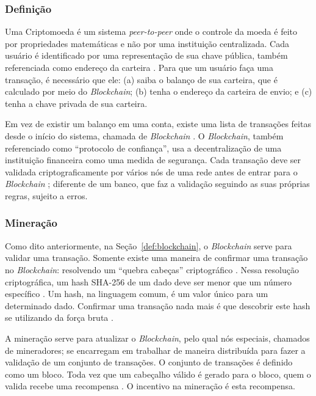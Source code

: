 \documentclass[
article,			%
12pt,				%
openright,			%
oneside,			%
a4paper,			%
chapter=TITLE,		%
section=TITLE,		%
subsection=TITLE,	%
subsubsection=TITLE,%
subsubsubsection=TITLE, %
english,			%
brazil,				%
]{abntex2}
\begin{document}
\subsubsection{Definição}

Uma Criptomoeda é um sistema \emph{peer-to-peer} onde o controle da
moeda é feito por propriedades matemáticas e não por uma instituição
centralizada. Cada usuário é identificado por uma representação de sua
chave pública, também referenciada como endereço da carteira
\cite{Weber2012}. Para que um usuário faça uma transação, é necessário
que ele: (a) saiba o balanço de sua carteira, que é calculado por meio
do \emph{Blockchain}; (b) tenha o endereço da carteira de envio; e (c)
tenha a chave privada de sua carteira.

Em vez de existir um balanço em uma conta, existe uma lista de
transações feitas desde o início do sistema, chamada de
\emph{Blockchain} \cite{Weber2012}\label{def:blockchain}. O
\emph{Blockchain}, também referenciado como ``protocolo de
confiança'', usa a decentralização de uma instituição financeira como
uma medida de segurança. Cada transação deve ser validada
criptograficamente por vários nós de uma rede antes de entrar para o
\emph{Blockchain} \cite{LChicarino}; diferente de um banco, que faz a
validação seguindo as suas próprias regras, sujeito a erros.

\subsubsection{Mineração}

Como dito anteriormente, na Seção~\ref{def:blockchain}, o
\emph{Blockchain} serve para validar uma transação. Somente existe uma
maneira de confirmar uma transação no \emph{Blockchain}: resolvendo um
``quebra cabeças'' criptográfico \cite{Weber2012}. Nessa resolução
criptográfica, um hash SHA-256 de um dado deve ser menor que um número
específico \cite{Dev2014}. Um hash, na linguagem comum, é um valor
único para um determinado dado.  Confirmar uma transação nada mais é
que descobrir este hash se utilizando da força bruta \cite{Arsov}.

A mineração serve para atualizar o \emph{Blockchain}, pelo qual nós
especiais, chamados de mineradores; se encarregam em trabalhar de
maneira distribuída para fazer a validação de um conjunto de
transações. O conjunto de transações é definido como um bloco. Toda
vez que um cabeçalho válido é gerado para o bloco, quem o valida
recebe uma recompensa \cite{LChicarino}. O incentivo na mineração é
esta recompensa.
\end{document}
